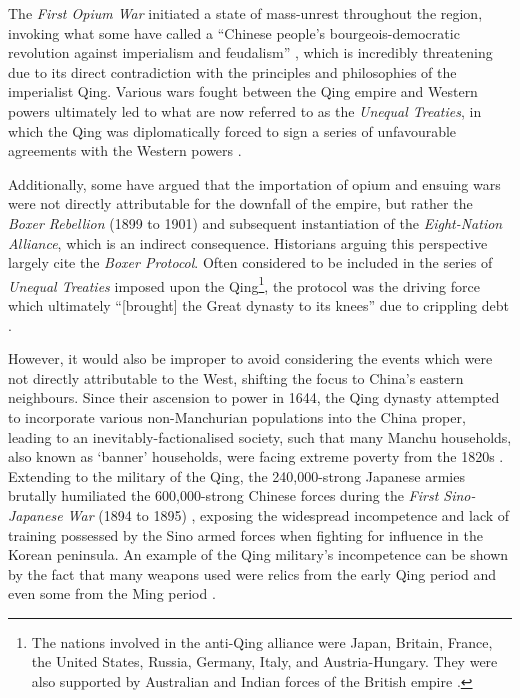 \documentclass[a4paper,oneside]{article}
\begin{document}
The \textit{First Opium War} initiated a state of mass-unrest throughout the
region, invoking what some have called a ``Chinese people's bourgeois-democratic
revolution against imperialism and feudalism'' \autocite{Janin:1999}, which is
incredibly threatening due to its direct contradiction with the principles and
philosophies of the imperialist Qing. Various wars fought between the Qing
empire and Western powers ultimately led to what are now referred to as the
\textit{Unequal Treaties}, in which the Qing was diplomatically forced to sign a
series of unfavourable agreements with the Western powers \autocite{Wang:2005}.

Additionally, some have argued that the importation of opium and ensuing wars
were not directly attributable for the downfall of the empire, but rather the
\textit{Boxer Rebellion} (1899 to 1901) and subsequent instantiation of the
\textit{Eight-Nation Alliance}, which is an indirect consequence. Historians
arguing this perspective largely cite the \textit{Boxer Protocol}. Often
considered to be included in the series of \textit{Unequal Treaties} imposed
upon the Qing\footnote{The nations involved in the anti-Qing alliance were
Japan, Britain, France, the United States, Russia, Germany, Italy, and
Austria-Hungary. They were also supported by Australian and Indian forces of the
British empire \autocite{Gardener:2016}.}, the protocol was the driving force
which ultimately ``[brought] the Great dynasty to its knees'' due to crippling
debt \autocite{Mitchell:2008}.

However, it would also be improper to avoid considering the events which were
not directly attributable to the West, shifting the focus to China's eastern
neighbours. Since their ascension to power in 1644, the Qing dynasty attempted
to incorporate various non-Manchurian populations into the China proper, leading
to an inevitably-factionalised society, such that many Manchu households, also
known as `banner' households, were facing extreme poverty from the 1820s
\autocite{Elliott:2006}.  Extending to the military of the Qing, the
240,000-strong Japanese armies brutally humiliated the 600,000-strong Chinese
forces during the \textit{First Sino-Japanese War} (1894 to 1895)
\autocite{Fenby:2013}, exposing the widespread incompetence and lack of training
possessed by the Sino armed forces \autocite{Jowett:2013} when fighting for
influence in the Korean peninsula. An example of the Qing military's
incompetence can be shown by the fact that many weapons used were relics from
the early Qing period and even some from the Ming period \autocite{Qi:1964}.
\end{document}
